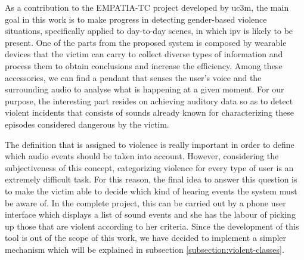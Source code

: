 	As a contribution to the EMPATIA-TC project developed by \acrlong{uc3m}, the main goal in this work is to make progress in detecting gender-based violence situations, specifically applied to day-to-day scenes, in which \acrshort{ipv} is likely to be present. One of the parts from the proposed system is composed by wearable devices that the victim can carry to collect diverse types of information and process them to obtain conclusions and increase the efficiency. Among these accessories, we can find a pendant that senses the user's voice and the surrounding audio to analyse what is happening at a given moment. For our purpose, the interesting part resides on achieving auditory data so as to detect violent incidents that consists of sounds already known for characterizing these episodes considered dangerous by the victim.
	
	The definition that is assigned to violence is really important in order to define which audio events should be taken into account. However, considering the subjectiveness of this concept, categorizing violence for every type of user is an extremely difficult task. For this reason, the final idea to answer this question is to make the victim able to decide which kind of hearing events the system must be aware of. In the complete project, this can be carried out by a phone user interface which displays a list of sound events and she has the labour of picking up those that are violent according to her criteria. Since the development of this tool is out of the scope of this work, we have decided to implement a simpler mechanism which will be explained in subsection \ref{subsection:violent-classes}.
	
%
	

